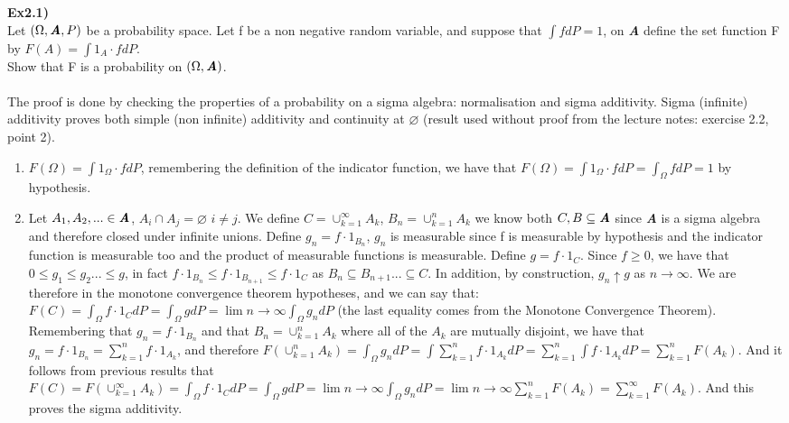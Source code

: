 \documentclass[12pt,mythesisstyle]{report}
\begin{document}
\textbf{Ex2.1)}\\
Let $(\Omega, \textbf{\textit{A}}, P)$ be a probability space. Let f be a non negative random variable, and suppose that $\int fdP=1$, on \textbf{\textit{A}} define the set function F by $F(A)=\int1_A\cdot fdP$.
\\
Show that F is a probability on $(\Omega, \textbf{\textit{A}})$.
\\
\\The proof is done by checking the properties of a probability on a sigma algebra: normalisation and sigma additivity. Sigma (infinite) additivity proves both simple (non infinite) additivity and continuity at $\varnothing$ (result used without proof from the lecture notes: exercise 2.2, point 2).

\begin{enumerate}
  \item $F(\Omega)=\int 1_\Omega\cdot fdP$, remembering the definition of the indicator function, we have that $F(\Omega)=\int 1_\Omega\cdot fdP=\int_\Omega fdP=1$ by hypothesis.
  \item Let $A_1, A_2,...\in\textbf{\textit{A}}$, $A_i\cap A_j=\varnothing$ $i\neq j$. We define $C=\cup_{k=1}^{\infty}A_k$, $B_n=\cup_{k=1}^{n}A_k$ we know both $C,B\subseteq\textbf{\textit{A}}$ since \textbf{\textit{A}} is a sigma algebra and therefore closed under infinite unions. Define $g_n=f\cdot 1_{B_n}$, $g_n$ is measurable since f is measurable by hypothesis and the indicator function is measurable too and the product of measurable functions is measurable. Define $g=f\cdot 1_{C}$. Since $f\geq 0$, we have that $0 \leq g_1\leq g_2...\leq g$, in fact $f\cdot 1_{B_n}\leq f\cdot 1_{B_{n+1}}\leq f\cdot 1_C$ as $B_n\subseteq B_{n+1}...\subseteq C$. In addition, by construction, $g_n\uparrow g$ as $n\rightarrow \infty$. We are therefore in the monotone convergence theorem hypotheses, and we can say that: $F(C)=\int_{\Omega} f\cdot 1_{C}dP=\int_{\Omega} gdP=\lim{n \rightarrow \infty}\int_{\Omega} g_n dP$ (the last equality comes from the Monotone Convergence Theorem). Remembering that $g_n=f\cdot 1_{B_n}$ and that $B_n=\cup_{k=1}^{n}A_k$ where all of the $A_k$ are mutually disjoint, we have that $g_n=f\cdot 1_{B_n}=\sum_{k=1}^n f\cdot 1_{A_k}$, and therefore $F(\cup_{k=1}^{n}A_k)=\int_{\Omega} g_n dP=\int\sum_{k=1}^n f\cdot 1_{A_k}dP=\sum_{k=1}^n\int f\cdot 1_{A_k}dP=\sum_{k=1}^n F(A_k)$. And it follows from previous results that $F(C)=F(\cup_{k=1}^{\infty}A_k)=\int_{\Omega} f\cdot 1_{C}dP=\int_{\Omega} gdP=\lim{n \rightarrow \infty}\int_{\Omega} g_n dP=\lim{n \rightarrow \infty} \sum_{k=1}^n F(A_k)=\sum_{k=1}^{\infty} F(A_k)$. And this proves the sigma additivity.
\end{enumerate}
\end{document}
